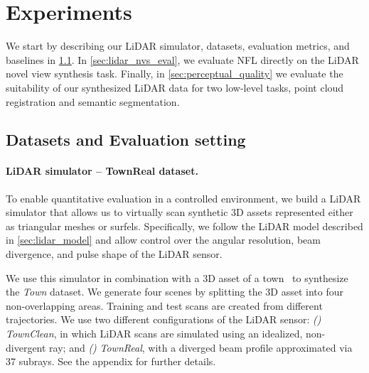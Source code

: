 












\section{Experiments}
\label{sec:results}
We start by describing our LiDAR simulator,  datasets, evaluation metrics, and baselines in \cref{sec:dataset}. In \cref{sec:lidar_nvs_eval}, we evaluate NFL directly on the LiDAR novel view synthesis task. Finally, in \cref{sec:perceptual_quality} we evaluate the suitability of our synthesized LiDAR data for two low-level tasks, point cloud registration and semantic segmentation.




\subsection{Datasets and Evaluation setting}
\label{sec:dataset}
\paragraph{LiDAR simulator -- TownReal dataset.} 
To enable quantitative evaluation in a controlled environment, we build a LiDAR simulator that allows us to virtually scan synthetic 3D assets represented either as triangular meshes or surfels. Specifically, we follow the LiDAR model described in \cref{sec:lidar_model} and allow control over the angular resolution, beam divergence, and pulse shape of the LiDAR sensor.  %

We use this simulator in combination with a 3D asset of a town~\cite{turbosquid} to synthesize the \emph{Town} dataset. We generate four scenes by splitting the 3D asset into four non-overlapping areas. Training and test scans %
are created from different trajectories.  We use two different configurations of the LiDAR sensor: \textit{()} \textit{TownClean}, in which LiDAR scans are simulated using an idealized, non-divergent ray; and \textit{()} \textit{TownReal}, with a diverged beam profile approximated via 37 subrays. See the appendix for further details.


